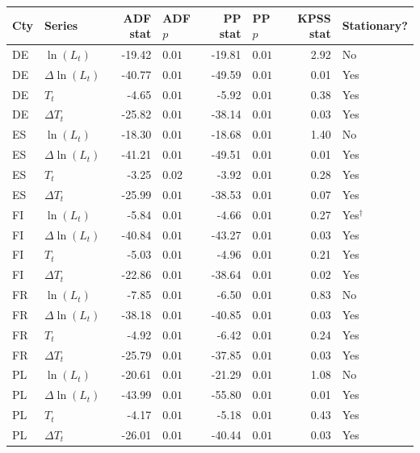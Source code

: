 
\begin{tabular}{llrlrlrl}
\toprule
Cty & Series & ADF stat & ADF $p$ & PP stat & PP $p$ & KPSS stat & Stationary?\\
\midrule
DE & $\ln(L_t)$ & -19.42 & $0.01$ & -19.81 & $0.01$ & 2.92 & No\\
DE & $\Delta\ln(L_t)$ & -40.77 & $0.01$ & -49.59 & $0.01$ & 0.01 & Yes\\
DE & $T_t$ & -4.65 & $0.01$ & -5.92 & $0.01$ & 0.38 & Yes\\
DE & $\Delta T_t$ & -25.82 & $0.01$ & -38.14 & $0.01$ & 0.03 & Yes\\
ES & $\ln(L_t)$ & -18.30 & $0.01$ & -18.68 & $0.01$ & 1.40 & No\\
ES & $\Delta\ln(L_t)$ & -41.21 & $0.01$ & -49.51 & $0.01$ & 0.01 & Yes\\
ES & $T_t$ & -3.25 & 0.02 & -3.92 & $0.01$ & 0.28 & Yes\\
ES & $\Delta T_t$ & -25.99 & $0.01$ & -38.53 & $0.01$ & 0.07 & Yes\\
FI & $\ln(L_t)$ & -5.84 & $0.01$ & -4.66 & $0.01$ & 0.27 & Yes$^\dag$\\
FI & $\Delta\ln(L_t)$ & -40.84 & $0.01$ & -43.27 & $0.01$ & 0.03 & Yes\\
FI & $T_t$ & -5.03 & $0.01$ & -4.96 & $0.01$ & 0.21 & Yes\\
FI & $\Delta T_t$ & -22.86 & $0.01$ & -38.64 & $0.01$ & 0.02 & Yes\\
FR & $\ln(L_t)$ & -7.85 & $0.01$ & -6.50 & $0.01$ & 0.83 & No\\
FR & $\Delta\ln(L_t)$ & -38.18 & $0.01$ & -40.85 & $0.01$ & 0.03 & Yes\\
FR & $T_t$ & -4.92 & $0.01$ & -6.42 & $0.01$ & 0.24 & Yes\\
FR & $\Delta T_t$ & -25.79 & $0.01$ & -37.85 & $0.01$ & 0.03 & Yes\\
PL & $\ln(L_t)$ & -20.61 & $0.01$ & -21.29 & $0.01$ & 1.08 & No\\
PL & $\Delta\ln(L_t)$ & -43.99 & $0.01$ & -55.80 & $0.01$ & 0.01 & Yes\\
PL & $T_t$ & -4.17 & $0.01$ & -5.18 & $0.01$ & 0.43 & Yes\\
PL & $\Delta T_t$ & -26.01 & $0.01$ & -40.44 & $0.01$ & 0.03 & Yes\\
\bottomrule
\end{tabular}
